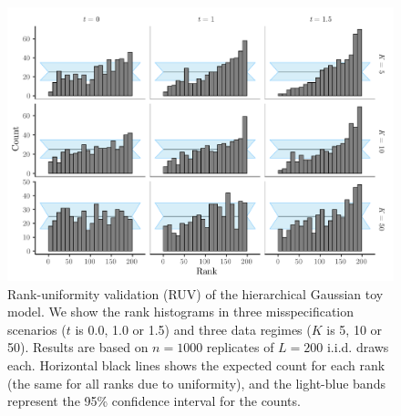 \documentclass[oneside]{article}
\begin{document}
\begin{figure}[!ht]
   \includegraphics[width=\linewidth]{../figures/sbc_normal_manual.pdf}
  \caption{Rank-uniformity validation (RUV) of the hierarchical Gaussian toy model.
  We show the rank histograms in three misspecification scenarios ($t$
  is 0.0, 1.0 or 1.5) and three data regimes ($K$ is 5, 10 or 50).
  Results are based on $n=1000$ replicates of $L= 200$ i.i.d. draws each.
  Horizontal black lines shows the expected count for each rank (the same for all ranks due to uniformity), and the light-blue bands represent the 95\% confidence interval for the counts.
    }
  \label{supfig:ruv_normal_toy}
\end{figure}
\end{document}
